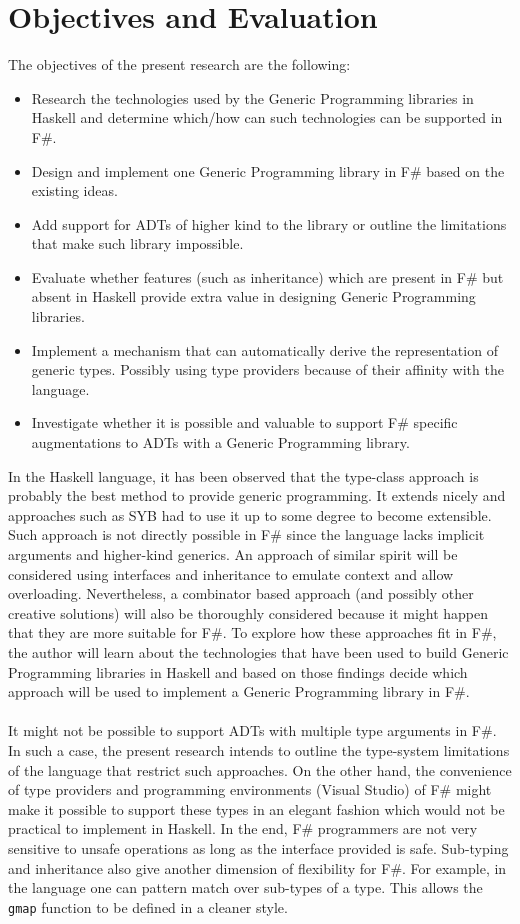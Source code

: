 \documentclass[8pt]{extarticle}
\begin{document}
\section{Objectives and Evaluation}
The objectives of the present research are the following:
\begin{itemize}
\item Research the technologies used by the Generic Programming libraries in Haskell and determine which/how can such technologies can be supported in F\#.
\item Design and implement one Generic Programming library in F\# based on the existing ideas.
\item Add support for ADTs of higher kind to the library or outline the limitations that make such library impossible.
\item Evaluate whether features (such as inheritance) which are present in F\# but absent in Haskell provide extra value in designing Generic Programming libraries.
\item Implement a mechanism that can automatically derive the representation of generic types. Possibly using type providers because of their affinity with the language.
\item Investigate whether it is possible and valuable to support F\# specific augmentations to ADTs with a Generic Programming library.
\end{itemize}
In the Haskell language, it has been observed that the type-class approach is probably the best method to provide generic programming. It extends nicely\cite{SYB,CompGen} and approaches such as SYB had to use it up to some degree to become extensible\cite{SYB}. Such approach is not directly possible in F\# since the language lacks implicit arguments and higher-kind generics. An approach of similar spirit will be considered using interfaces and inheritance to emulate context and allow overloading. Nevertheless, a combinator based approach (and possibly other creative solutions) will also be thoroughly considered because it might happen that they are more suitable for F\#. To explore how these approaches fit in F\#, the author will learn about the technologies that have been used to build Generic Programming libraries in Haskell and based on those findings decide which approach will be used to implement a Generic Programming library in F\#.
\\\\
It might not be possible to support ADTs with multiple type arguments in F\#. In such a case, the present research intends to outline the type-system limitations of the language that restrict such approaches. On the other hand, the convenience of type providers and programming environments (Visual Studio) of F\# might make it possible to support these types in an elegant fashion which would not be practical to implement in Haskell. In the end, F\# programmers are not very sensitive to unsafe operations as long as the interface provided is safe. Sub-typing and inheritance also give another dimension of flexibility for F\#. For example, in the language one can pattern match over sub-types of a type. This allows the \verb+gmap+ function to be defined in a cleaner style\cite{RegularFSharp}.
\end{document}
